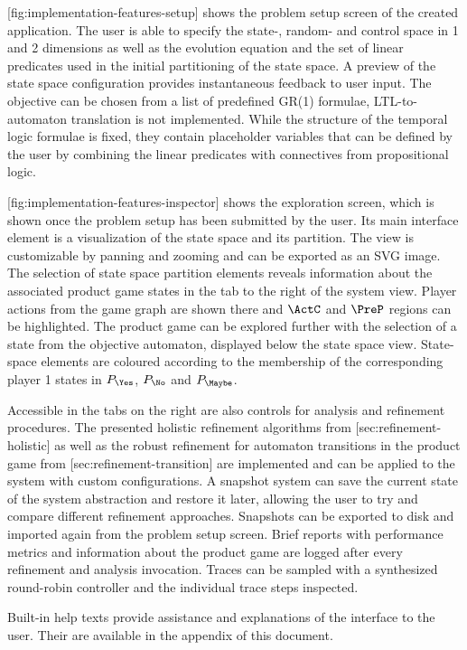 

[fig:implementation-features-setup] shows the problem setup screen of the created application.
The user is able to specify the state-, random- and control space in 1 and 2 dimensions as well as the evolution equation and the set of linear predicates used in the initial partitioning of the state space.
A preview of the state space configuration provides instantaneous feedback to user input.
The objective can be chosen from a list of predefined GR(1) formulae, LTL-to-automaton translation is not implemented.
While the structure of the temporal logic formulae is fixed, they contain placeholder variables that can be defined by the user by combining the linear predicates with connectives from propositional logic.

[fig:implementation-features-inspector] shows the exploration screen, which is shown once the problem setup has been submitted by the user.
Its main interface element is a visualization of the state space and its partition.
The view is customizable by panning and zooming and can be exported as an SVG image.
The selection of state space partition elements reveals information about the associated product game states in the  tab to the right of the system view.
Player actions from the game graph are shown there and $\ActC$ and $\PreP$ regions can be highlighted.
The product game can be explored further with the selection of a state from the objective automaton, displayed below the state space view.
State-space elements are coloured according to the membership of the corresponding player 1 states in $P_\Yes$, $P_\No$ and $P_\Maybe$.

Accessible in the tabs on the right are also controls for analysis and refinement procedures.
The presented holistic refinement algorithms from [sec:refinement-holistic] as well as the robust refinement for automaton transitions in the product game from [sec:refinement-transition] are implemented and can be applied to the system with custom configurations.
A snapshot system can save the current state of the system abstraction and restore it later, allowing the user to try and compare different refinement approaches.
Snapshots can be exported to disk and imported again from the problem setup screen.
Brief reports with performance metrics and information about the product game are logged after every refinement and analysis invocation.
Traces can be sampled with a synthesized round-robin controller and the individual trace steps inspected.

Built-in help texts provide assistance and explanations of the interface to the user.
Their are available in the appendix of this document.

